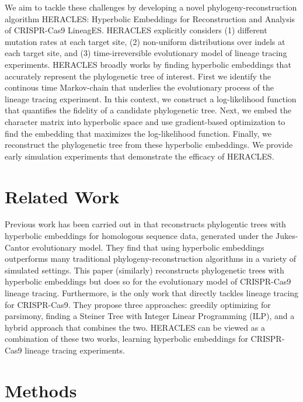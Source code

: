 \documentclass{article}
\begin{document}
We aim to tackle these challenges by developing a novel phylogeny-reconstruction algorithm HERACLES: Hyperbolic Embeddings for Reconstruction and Analysis of CRISPR-Cas9 LineagES. HERACLES explicitly considers (1) different mutation rates at each target site, (2) non-uniform distributions over indels at each target site, and (3) time-irreversible evolutionary model of lineage tracing experiments. HERACLES broadly works by finding hyperbolic embeddings that accurately represent the phylogenetic tree of interest. First we identify the continous time Markov-chain that underlies the evolutionary process of the lineage tracing experiment. In this context, we construct a log-likelihood function that quantifies the fidelity of a candidate phylogenetic tree. Next, we embed the character matrix into hyperbolic space and use gradient-based optimization to find the embedding that maximizes the log-likelihood function. Finally, we reconstruct the phylogenetic tree from these hyperbolic embeddings. We provide early simulation experiments that demonstrate the efficacy of HERACLES.


\section{Related Work}


Previous work has been carried out in \cite{wilson2021learning} that reconstructs phylogentic trees with hyperbolic embeddings for homologous sequence data, generated under the Jukes-Cantor evolutionary model. They find that using hyperbolic embeddings outperforms many traditional phylogeny-reconstruction algorithms in a variety of simulated settings. This paper (similarly) reconstructs phylogenetic trees with hyperbolic embeddings but does so for the evolutionary model of CRISPR-Cas9 lineage tracing. Furthermore, \cite{jones2020inference} is the only work that directly tackles lineage tracing for CRISPR-Cas9. They propose three approaches: greedily optimizing for parsimony, finding a Steiner Tree with Integer Linear Programming (ILP), and a hybrid approach that combines the two. HERACLES can be viewed as a combination of these two works, learning hyperbolic embeddings for CRISPR-Cas9 lineage tracing experiments.


\section{Methods}
\end{document}
